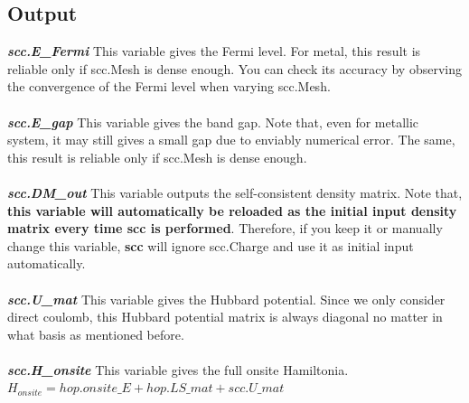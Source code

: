 \documentclass[10pt,a4paper]{article}
\begin{document}
\subsection{Output}
\textit{\textbf{scc.E\_Fermi}} This variable gives the Fermi level. For metal, this result is reliable only if scc.Mesh is dense enough. You can check its accuracy by observing the convergence of  the Fermi level when varying scc.Mesh. \\ \\
\textit{\textbf{scc.E\_gap}} This variable gives the band gap. Note that, even for metallic system, it may still gives a small gap due to enviably numerical error. The same, this result is reliable only if scc.Mesh is dense enough. \\ \\
\textit{\textbf{scc.DM\_out}} This variable outputs the self-consistent density matrix. Note that, \textbf{this variable will automatically be reloaded as the initial input density matrix every time scc is performed}. Therefore, if you keep it or manually change this variable, \textbf{scc} will ignore scc.Charge and use it as initial input automatically. \\ \\ 
\textit{\textbf{scc.U\_mat}} This variable gives the Hubbard potential. Since we only consider direct coulomb, this Hubbard potential matrix is always diagonal no matter in what basis as mentioned before.\\ \\ 
\textit{\textbf{scc.H\_onsite}} This variable gives the full onsite Hamiltonia. $H_{onsite}=hop.onsite\_E+hop.LS\_mat+scc.U\_mat$
\end{document}
